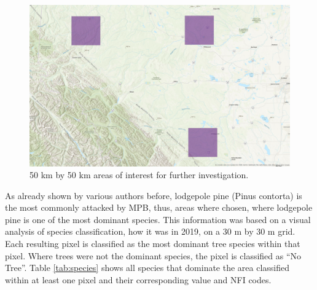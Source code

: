 \documentclass[
]{article}
\begin{document}
\begin{figure}

{\centering \includegraphics[width=0.8\linewidth]{../graphics/AreasOfInterest} 

}

\caption{50 km by 50 km areas of interest for further investigation.}\label{fig:AoIs}
\end{figure}

As already shown by various authors before, lodgepole pine (Pinus contorta) is the most commonly attacked by MPB, thus, areas where chosen, where lodgepole pine is one of the most dominant species. This information was based on a visual analysis of species classification, how it was in 2019, on a 30 m by 30 m grid. Each resulting pixel is classified as the most dominant tree species within that pixel. Where trees were not the dominant species, the pixel is classified as ``No Tree''. Table \ref{tab:species} shows all species that dominate the area classified within at least one pixel and their corresponding value and NFI codes.
\end{document}

